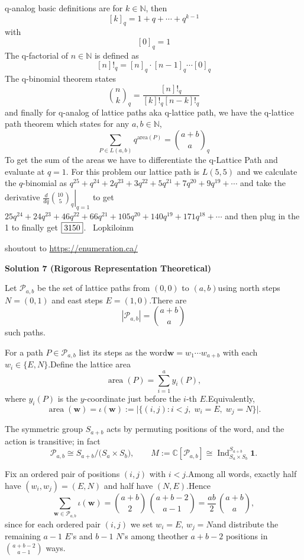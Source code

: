 \begin{enumerate}
q-analog basic definitions are for $k\in\mathbb{N}$, then 
 \[[k]_q=1+q+\cdots+q^{k-1}\] with 
 \[[0]_q=1\] The q-factorial of $n\in\mathbb{N}$ is defined as 
 \[[n]!_q=[n]_q\cdot[n-1]_q\cdots[0]_q\] The q-binomial theorem states 
 \[\binom{n}{k}_q=\frac{[n]!_q}{[k]!_q[n-k]!_q}\] and finally for q-analog of lattice paths aka q-lattice path, we have the q-lattice path theorem which states for any $a, b\in\mathbb{N}$, 
 \[\sum_{P\in L(a,b)}q^{\text{area}(P)}=\binom{a+b}{a}_q\] To get the sum of the areas we have to differentiate the q-Lattice Path and evaluate at $q=1$. For this problem our lattice path is $L(5,5)$ and we calculate the $q$-binomial as $q^{25}+q^{24}+2q^{23}+3q^{22}+5q^{21}+7q^{20}+9q^{19}+\cdots$ and take the derivative $\left.\frac{d}{dq}\binom{10}{5}_q\right|_{q=1}$ to get $25q^{24}+24q^{23}+46q^{22}+66q^{21}+105q^{20}+140q^{19}+171q^{18}+\cdots$ and then plug in the 1 to finally get $\fbox{3150}$. ~Lopkiloinm

 shoutout to \href{https://enumeration.ca/}{https://enumeration.ca/}

 



\textbf{Solution 7 (Rigorous Representation Theoretical)}

Let $\mathcal P_{a,b}$ be the set of lattice paths from $(0,0)$ to $(a,b)$using north steps $N=(0,1)$ and east steps $E=(1,0)$.There are
 \[|\mathcal P_{a,b}|=\binom{a+b}{a}\]such paths.

 For a path $P\in\mathcal P_{a,b}$ list its steps as the word$\mathbf w=w_1\cdots w_{a+b}$ with each $w_i\in\{E,N\}$.Define the lattice area
 \[\operatorname{area}(P)=\sum_{i=1}^{a}y_i(P),\]where $y_i(P)$ is the $y$-coordinate just before the $i$-th $E$.Equivalently,
 \[\operatorname{area}(\mathbf w)= \iota(\mathbf w):= \bigl|\{(i,j):i<j,\;w_i=E,\;w_j=N\}\bigr|.\]

 The symmetric group $S_{a+b}$ acts by permuting positions of the word, and the action is transitive; in fact
 \[\mathcal P_{a,b}\cong S_{a+b}\big/\!\bigl(S_a\times S_b\bigr), \qquad M:=\mathbb C[\mathcal P_{a,b}]\cong \operatorname{Ind}^{S_{a+b}}_{S_a\times S_b}\mathbf 1.\]

 Fix an ordered pair of positions $(i,j)$ with $i<j$.Among all words, exactly half have $(w_i,w_j)=(E,N)$ and half have $(N,E)$.Hence
 \[\sum_{\mathbf w\in\mathcal P_{a,b}}\iota(\mathbf w) =\binom{a+b}{2}\,\binom{a+b-2}{a-1} =\frac{ab}{2}\,\binom{a+b}{a},\]since for each ordered pair $(i,j)$ we set $w_i=E$, $w_j=N$and distribute the remaining $a-1$ $E$’s and $b-1$ $N$’s among theother $a+b-2$ positions in $\binom{a+b-2}{a-1}$ ways.


\end{enumerate}
